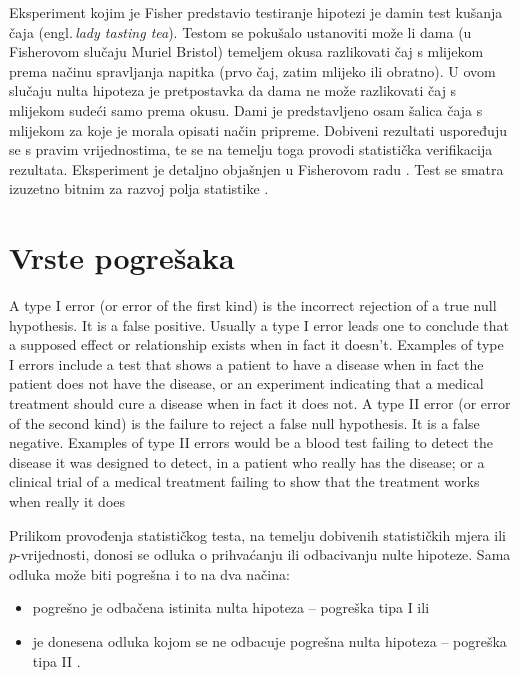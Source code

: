 Eksperiment kojim je Fisher predstavio testiranje hipotezi je damin test kušanja čaja (engl.\,\textit{lady tasting tea}). Testom se pokušalo ustanoviti može li dama (u Fisherovom slučaju Muriel Bristol) temeljem okusa razlikovati čaj s mlijekom prema načinu spravljanja napitka (prvo čaj, zatim mlijeko ili obratno). U ovom slučaju nulta hipoteza je pretpostavka da dama ne može razlikovati čaj s mlijekom sudeći samo prema okusu. Dami je predstavljeno osam šalica čaja s mlijekom za koje je morala opisati način pripreme. Dobiveni rezultati uspoređuju se s pravim vrijednostima, te se na temelju toga provodi statistička verifikacija rezultata. Eksperiment je detaljno objašnjen u Fisherovom radu \cite{fisher1935design}. Test se smatra izuzetno bitnim za razvoj polja statistike \citep{potter2001lady}.

\section{Vrste pogrešaka}

A type I error (or error of the first kind) is the incorrect rejection of a true null hypothesis. It is a false positive. Usually a type I error leads one to conclude that a supposed effect or relationship exists when in fact it doesn't. Examples of type I errors include a test that shows a patient to have a disease when in fact the patient does not have the disease, or an experiment indicating that a medical treatment should cure a disease when in fact it does not.
A type II error (or error of the second kind) is the failure to reject a false null hypothesis. It is a false negative. Examples of type II errors would be a blood test failing to detect the disease it was designed to detect, in a patient who really has the disease; or a clinical trial of a medical treatment failing to show that the treatment works when really it does

Prilikom provođenja statističkog testa, na temelju dobivenih statističkih mjera ili $p$-vrijednosti, donosi se odluka o prihvaćanju ili odbacivanju nulte hipoteze. Sama odluka može biti pogrešna i to na dva načina:
\begin{itemize}
\item pogrešno je odbačena istinita nulta hipoteza -- pogreška tipa I  ili 
\item je donesena odluka kojom se ne odbacuje pogrešna nulta hipoteza -- pogreška tipa II .
\end{itemize}

